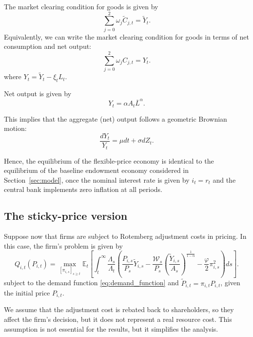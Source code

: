 The market clearing condition for goods is given by
\begin{equation}
    \sum_{j=0}^2 \omega_j \tilde{C}_{j,t} = \tilde{Y}_t.
\end{equation}
Equivalently, we can write the market clearing condition for goods in terms of net consumption and net output:
\begin{equation}
    \sum_{j=0}^2 \omega_j C_{j,t} = Y_t.
\end{equation}
where $Y_t = \tilde{Y}_t - \xi_t L_t$.

Net output is given by
\begin{equation}
    Y_t = \alpha A_t \overline{L}^\alpha.
\end{equation}

This implies that the aggregate (net) output follows a geometric Brownian motion:
\begin{equation}
    \frac{dY_t}{Y_t} = \mu dt + \sigma dZ_t.
\end{equation}

Hence, the equilibrium of the flexible-price economy is identical to the equilibrium of the baseline endowment economy considered in Section~\ref{sec:model}, once the nominal interest rate is given by $i_t = r_t$ and the central bank implements zero inflation at all periods.


\subsection{The sticky-price version}

Suppose now that firms are subject to Rotemberg adjustment costs in pricing. In this case, the firm's problem is given by
\begin{equation}
    Q_{i,t}(P_{i,t}) = \max_{[\pi_{i,s}]_{s\geq t} }\mathbb{E}_t \left[ \int_t^\infty \frac{\Lambda_{s}}{\Lambda_t} \left( \frac{P_{i,s}}{P_s} \tilde{Y}_{i,s} - \frac{\mathcal{W}_{s}}{P_s} \left(\frac{\tilde{Y}_{i,s}}{A_s}\right)^{\frac{1}{1-\alpha}}  - \frac{\varphi}{2} \pi_{i,s}^2\right)ds  \right].
\end{equation}
subject to the demand function \eqref{eq:demand_function} and $\tilde{P}_{i,t} = \pi_{i,t}P_{i,t}$, given the initial price $P_{i,t}$.

We assume that the adjustment cost is rebated back to shareholders, so they affect the firm's decision, but it does not represent a real resource cost. 
This assumption is not essential for the results, but it simplifies the analysis.

